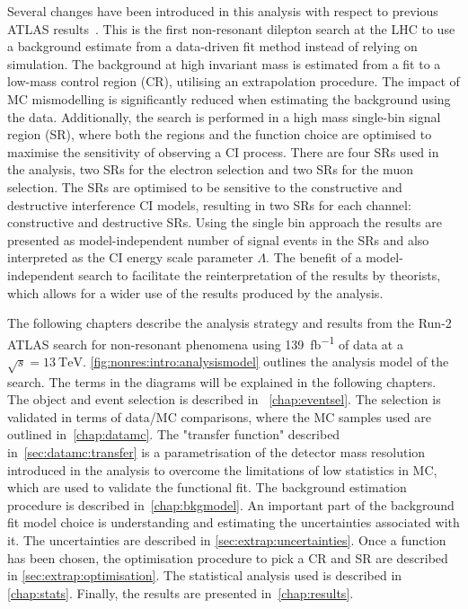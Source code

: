 Several changes have been introduced in this analysis with respect to previous ATLAS results~\cite{EXOT-2016-05}. This is the first non-resonant dilepton search at the LHC to use a background estimate from a data-driven fit method instead of relying on simulation. The background at high invariant mass is estimated from a fit to a low-mass control region (CR), utilising an extrapolation procedure. The impact of MC mismodelling is significantly reduced when estimating the background using the data. Additionally, the search is performed in a high mass single-bin signal region (SR), where both the regions and the function choice are optimised to maximise the sensitivity of observing a CI process. There are four SRs used in the analysis, two SRs for the electron selection and two SRs for the muon selection. The SRs are optimised to be sensitive to the constructive and destructive interference CI models, resulting in two SRs for each channel: constructive and destructive SRs. Using the single bin approach the results are presented as  model-independent number of signal events in the SRs and also interpreted as the CI energy scale parameter $\Lambda$. The benefit of a model-independent search to facilitate the reinterpretation of the results by theorists, which allows for a wider use of the results produced by the analysis. 

The following chapters describe the analysis strategy and results from the Run-2 ATLAS search for non-resonant phenomena using \SI{139}{\femto\barn^{-1}} of data at a $\sqrt{s}=\SI{13}{\tera\electronvolt}$. \cref{fig:nonres:intro:analysismodel} outlines the analysis model of the search. The terms in the diagrams will be explained in the following chapters. The object and event selection is described in ~\cref{chap:eventsel}. The selection is validated in terms of data/MC comparisons, where the MC samples used are outlined in~\cref{chap:datamc}. The "transfer function" described in~\cref{sec:datamc:transfer} is a parametrisation of the detector mass resolution introduced in the analysis to overcome the limitations of low statistics in MC, which are used to validate the functional fit. The background estimation procedure is described in~\cref{chap:bkgmodel}. An important part of the background fit model choice is understanding and estimating the uncertainties associated with it. The uncertainties are described in \cref{sec:extrap:uncertainties}. Once a function has been chosen, the optimisation procedure to pick a CR and SR are described in \cref{sec:extrap:optimisation}. The statistical analysis used is described in \cref{chap:stats}. Finally, the results are presented in~\cref{chap:results}. 

